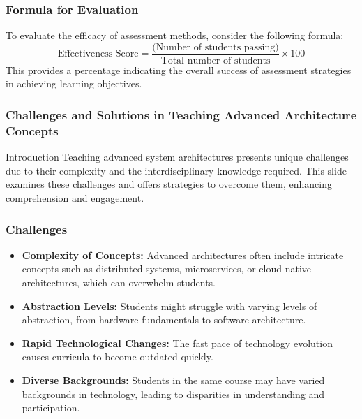 \documentclass[aspectratio=169]{beamer}
\begin{document}
\begin{frame}[fragile]
    \frametitle{Formula for Evaluation}
    To evaluate the efficacy of assessment methods, consider the following formula:
    \begin{equation}
        \text{Effectiveness Score} = \frac{\text{(Number of students passing)}}{\text{Total number of students}} \times 100
    \end{equation}
    This provides a percentage indicating the overall success of assessment strategies in achieving learning objectives.
\end{frame}

\begin{frame}[fragile]
    \frametitle{Challenges and Solutions in Teaching Advanced Architecture Concepts}
    \begin{block}{Introduction}
        Teaching advanced system architectures presents unique challenges due to their complexity and the interdisciplinary knowledge required. This slide examines these challenges and offers strategies to overcome them, enhancing comprehension and engagement.
    \end{block}
\end{frame}

\begin{frame}[fragile]
    \frametitle{Challenges}
    \begin{itemize}
        \item \textbf{Complexity of Concepts:} 
        Advanced architectures often include intricate concepts such as distributed systems, microservices, or cloud-native architectures, which can overwhelm students.  
        \item \textbf{Abstraction Levels:} 
        Students might struggle with varying levels of abstraction, from hardware fundamentals to software architecture.
        \item \textbf{Rapid Technological Changes:} 
        The fast pace of technology evolution causes curricula to become outdated quickly. 
        \item \textbf{Diverse Backgrounds:} 
        Students in the same course may have varied backgrounds in technology, leading to disparities in understanding and participation.
    \end{itemize}
\end{frame}
\end{document}
